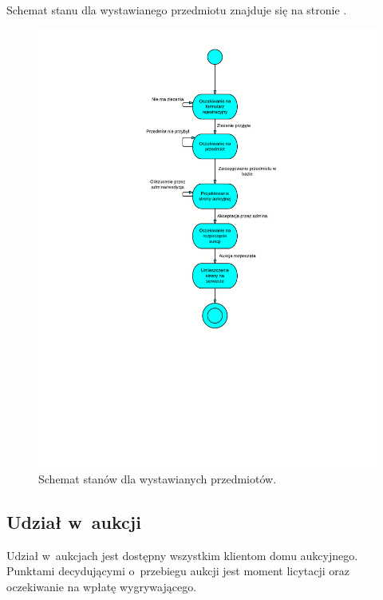 \documentclass[10pt,a4paper]{article}
\begin{document}
Schemat stanu dla wystawianego przedmiotu znajduje się na stronie
\pageref{fig:stan_wystaw_przedmiot}.

\newpage
\begin{figure}[hb]
  \begin{adjustwidth}{-3cm}{-3cm}
    \centering
    \includegraphics{figury/stan-wystaw-przedmiot}
    \caption{Schemat stanów dla wystawianych przedmiotów.}
    \label{fig:stan_wystaw_przedmiot}
  \end{adjustwidth}
\end{figure}
\clearpage

\subsection{Udział w~aukcji}

Udział w~aukcjach jest dostępny wszystkim klientom domu aukcyjnego. Punktami
decydującymi o~przebiegu aukcji jest moment licytacji oraz oczekiwanie na
wpłatę wygrywającego.
\end{document}

